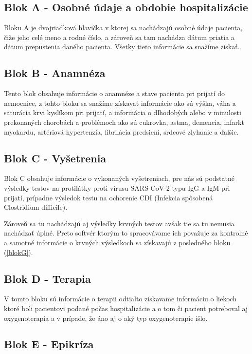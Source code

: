 \subsection{Blok A - Osobné údaje a obdobie hospitalizácie}

Bloku A je dvojriadková hlavička v ktorej sa nachádzajú osobné údaje pacienta, čiže jeho celé meno a rodné číslo, a zároveň sa tam nachádza dátum priatia a dátum prepustenia daného pacienta. Všetky tieto informácie sa snažíme získať.

\subsection{Blok B - Anamnéza}

Tento blok obsahuje informácie o anamnéze a stave pacienta pri prijatí do nemocnice, z tohto bloku sa snažíme získavať informácie ako sú výška, váha a saturácia krvi kyslíkom pri prijatí, a informácia o dlhodobých alebo v minulosti prekonaných chorobách a problémoch ako sú cukrovka, astma, demencia, infarkt myokardu, artériová hypertenzia, fibrilácia predsiení, srdcové zlyhanie a ďalšie.

\subsection{Blok C - Vyšetrenia}
\label{blokC}
Blok C obsahuje informácie o vykonaných vyšetreniach, pre nás sú podstatné výsledky testov na protilátky proti vírusu SARS-CoV-2 typu IgG a IgM pri prijatí, prípadne výsledok testu na ochorenie CDI (Infekcia spôsobená Clostridium difficile).

Zároveň sa tu nachádzajú aj výsledky krvných testov avšak tie sa tu nemusia nachádzať úplné. Preto softvér ktorým to spracovávame ich považuje za kontrolné a samotné informácie o krvných výsledkoch sa získavajú z posledného bloku (\ref{blokG}).

\subsection{Blok D - Terapia}

V tomto bloku sú informácie o terapii odtiaľto získavame informáciu o liekoch ktoré boli pacientovi podané počas hospitalizácie a o tom či pacient potreboval aj oxygenoterapia a v prípade, že áno aj o aký typ oxygenoterapie išlo.

\subsection{Blok E - Epikríza}

